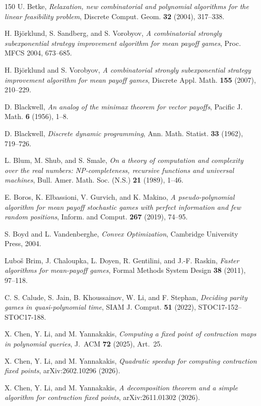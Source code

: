 \begin{thebibliography}{150}
U. Betke, \emph{Relaxation, new combinatorial and polynomial algorithms for the linear feasibility problem}, Discrete Comput. Geom. \textbf{32} (2004), 317--338.

H. Bj\"orklund, S. Sandberg, and S. Vorobyov, \emph{A combinatorial strongly subexponential strategy improvement algorithm for mean payoff games}, Proc. MFCS 2004, 673--685.

H. Bj\"orklund and S. Vorobyov, \emph{A combinatorial strongly subexponential strategy improvement algorithm for mean payoff games}, Discrete Appl. Math. \textbf{155} (2007), 210--229.

D. Blackwell, \emph{An analog of the minimax theorem for vector payoffs}, Pacific J. Math. \textbf{6} (1956), 1--8.

D. Blackwell, \emph{Discrete dynamic programming}, Ann. Math. Statist. \textbf{33} (1962), 719--726.

L. Blum, M. Shub, and S. Smale, \emph{On a theory of computation and complexity over the real numbers: NP-completeness, recursive functions and universal machines}, Bull. Amer. Math. Soc. (N.S.) \textbf{21} (1989), 1--46.

E. Boros, K. Elbassioni, V. Gurvich, and K. Makino, \emph{A pseudo-polynomial algorithm for mean payoff stochastic games with perfect information and few random positions}, Inform. and Comput. \textbf{267} (2019), 74--95.

S. Boyd and L. Vandenberghe, \emph{Convex Optimization}, Cambridge University Press, 2004.

Lubo\v{s} Brim, J. Chaloupka, L. Doyen, R. Gentilini, and J.-F. Raskin, \emph{Faster algorithms for mean-payoff games}, Formal Methods System Design \textbf{38} (2011), 97--118.

C. S. Calude, S. Jain, B. Khoussainov, W. Li, and F. Stephan, \emph{Deciding parity games in quasi-polynomial time}, SIAM J. Comput. \textbf{51} (2022), STOC17-152--STOC17-188.

X. Chen, Y. Li, and M. Yannakakis, \emph{Computing a fixed point of contraction maps in polynomial queries}, J.~ACM \textbf{72} (2025), Art.~25.

X. Chen, Y. Li, and M. Yannakakis, \emph{Quadratic speedup for computing contraction fixed points}, arXiv:2602.10296 (2026).

X. Chen, Y. Li, and M. Yannakakis, \emph{A decomposition theorem and a simple algorithm for contraction fixed points}, arXiv:2611.01302 (2026).


\end{thebibliography}
